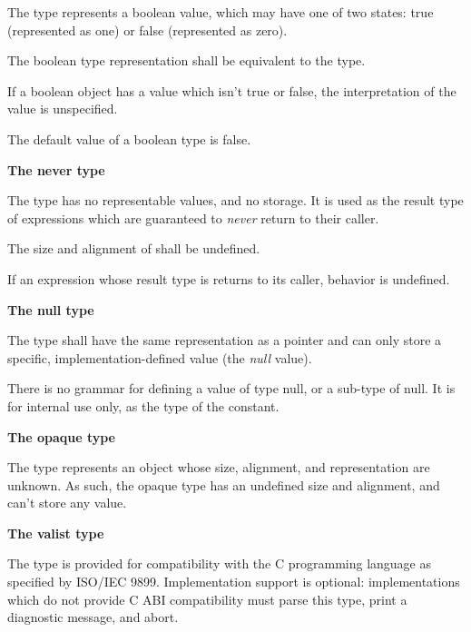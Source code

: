 \specsubsubitem
The  type represents a boolean value, which may have one of two
states: true (represented as one) or false (represented as zero).

\specsubsubitem
The boolean type representation shall be equivalent to the  type.

\specsubsubitem
If a boolean object has a value which isn't true or false, the interpretation of
the value is unspecified.

\specsubsubitem
The default value of a boolean type is false.

\textbf{The never type}

\specsubsubitem
The  type has no representable values, and no storage. It is
used as the result type of expressions which are guaranteed to \textit{never}
return to their caller.

\specsubsubitem
The size and alignment of  shall be undefined.

\specsubsubitem
If an expression whose result type is  returns to its caller,
behavior is undefined.


\textbf{The null type}

\specsubsubitem
The  type shall have the same representation as a pointer and can
only store a specific, implementation-defined value (the \textit{null} value).

\specsubsubitem
There is no grammar for defining a value of type null, or a sub-type of null. It
is for internal use only, as the type of the  constant.

\textbf{The opaque type}

The  type represents an object whose size, alignment, and
representation are unknown. As such, the opaque type has an undefined size and
alignment, and can't store any value.


\textbf{The valist type}

\specsubsubitem
The  type is provided for compatibility with the C programming
language as specified by ISO/IEC 9899. Implementation support is optional:
implementations which do not provide C ABI compatibility must parse this type,
print a diagnostic message, and abort.

